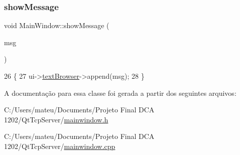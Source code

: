 \subsubsection{\texorpdfstring{show\+Message}{showMessage}}
{\footnotesize\ttfamily void Main\+Window\+::show\+Message (\begin{DoxyParamCaption}\item[{Q\+String}]{msg }\end{DoxyParamCaption})\hspace{0.3cm}{\ttfamily [slot]}}


\begin{DoxyCode}
26                                        \{
27   ui->\mbox{\hyperlink{class_ui___main_window_a2c789c07fa5fc1cee05aae8df52bb02d}{textBrowser}}->append(msg);
28 \}
\end{DoxyCode}


A documentação para essa classe foi gerada a partir dos seguintes arquivos\+:\begin{DoxyCompactItemize}
\item 
C\+:/\+Users/mateu/\+Documents/\+Projeto Final D\+C\+A 1202/\+Qt\+Tcp\+Server/\mbox{\hyperlink{mainwindow_8h}{mainwindow.\+h}}\item 
C\+:/\+Users/mateu/\+Documents/\+Projeto Final D\+C\+A 1202/\+Qt\+Tcp\+Server/\mbox{\hyperlink{mainwindow_8cpp}{mainwindow.\+cpp}}\end{DoxyCompactItemize}
